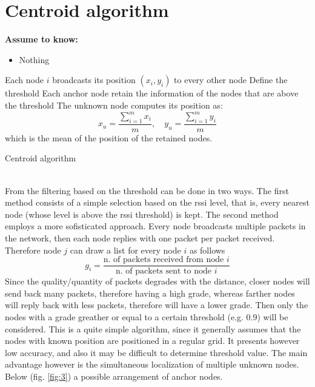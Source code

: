 \documentclass[12pt,twoside]{report}
\begin{document}
\section{Centroid algorithm}
  \begin{center}
  \textbf{Assume to know:}
  \begin{itemize}
    \centering
    \item Nothing
  \end{itemize}
  \end{center}
\begin{algorithm}[H]
\SetAlgoLined
{}
 Each node $i$ broadcasts its position $(x_i,y_i)$ to every other node\;
 Define the threshold\;
 Each anchor node retain the information of the nodes that are above the threshold\;
 The unknown node computes its position as:
 \begin{equation}
     x_u=\frac{\sum_{i=1}^mx_i}{m},\quad y_u=\frac{\sum_{i=1}^my_i}{m}
 \end{equation}
 which is the mean of the position of the retained nodes.
 \caption{Centroid algorithm}
\end{algorithm}
\noindent\\From \cite{878533} the filtering based on the threshold can be done in two ways. The first method consists of a simple selection based on the rssi level, that is, every nearest node (whose level is above the rssi threshold) is kept. The second method employs a more sofisticated approach. Every node broadcasts multiple packets in the network, then each node replies with one packet per packet received. Therefore node $j$ can draw a list for every node $i$ as follows 
\begin{equation}
    g_i = \frac{\text{n. of packets received from node $i$}}{\text{n. of packets sent to node $i$}}
\end{equation}
Since the quality/quantity of packets degrades with the distance, closer nodes will send back many packets, therefore having a high grade, whereas farther nodes will reply back with less packets, therefore will have a lower grade. Then only the nodes with a grade greather or equal to a certain threshold (e.g. $0.9$) will be considered. This is a quite simple algorithm, since it generally assumes that the nodes with known position are positioned in a regular grid. It presents however low accuracy, and also it may be difficult to determine threshold value. The main advantage however is the simultaneous localization of multiple unknown nodes. Below (fig. \ref{fig:3}) a possible arrangement of anchor nodes.
\end{document}
